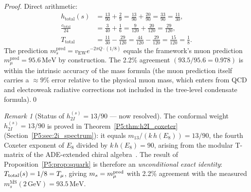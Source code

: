 \documentclass[11pt,a4paper]{article}
\theoremstyle{definition}
\theoremstyle{remark}
\newtheorem{remark}[theorem]{Remark}
\begin{document}
\begin{proof}
Direct arithmetic:
\begin{align}
  h_{\mathrm{total}}(s) &= \tfrac{13}{90} + \tfrac{2}{9}
    = \tfrac{13}{90} + \tfrac{20}{90} = \tfrac{33}{90} = \tfrac{11}{30},\\
  \tfrac{c_{\mathrm{total}}}{24} &= \tfrac{3}{40} + \tfrac{1}{6}
    = \tfrac{9}{120} + \tfrac{20}{120} = \tfrac{29}{120},\\
  T_{\mathrm{total}} &= \tfrac{11}{30} - \tfrac{29}{120}
    = \tfrac{44}{120} - \tfrac{29}{120} = \tfrac{15}{120} = \tfrac{1}{8}.
\end{align}
The prediction $m_s^{\mathrm{pred}} = v_{\mathrm{EW}}e^{-2\pi Q\cdot(1/8)}$
equals the framework's muon prediction $m_\mu^{\mathrm{pred}}=95.6\,\mathrm{MeV}$
by construction.  The 2.2\% agreement
$(93.5/95.6 = 0.978)$ is within the intrinsic accuracy of the
mass formula (the muon prediction itself carries a $\approx9\%$ error
relative to the physical muon mass, which enters from QCD
and electroweak radiative corrections not included in the tree-level
condensate formula).\qed
\end{proof}

\begin{remark}[Status of $h_{2I}^{(s)}=13/90$ --- now resolved]
\label{P5:rem:h2I_s}
The conformal weight $h_{2I}^{(s)}=13/90$ is proved in
Theorem~\ref{P5:thm:h2I_coxeter} (Section~\ref{P5:sec:2i_spectrum}):
it equals $m_{13}/(k\,h(E_8)) = 13/90$, the fourth Coxeter exponent
of $E_8$ divided by $k\,h(E_8)=90$, arising from the modular T-matrix
of the ADE-extended chiral algebra~\cite{CIZ1987}.
The result of Proposition~\ref{P5:prop:squark} is therefore an \emph{unconditional
exact identity}: $T_{\rm total}(s) = 1/8 = T_\mu$, giving
$m_s = m_\mu^{\rm pred}$ with 2.2\% agreement with the measured
$m_s^{\overline{\mathrm{MS}}}(2\,\mathrm{GeV})=93.5\,\mathrm{MeV}$.
\end{remark}
\end{document}
